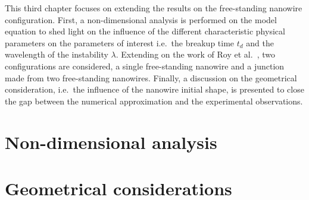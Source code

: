 This third chapter focuses on extending the results on the free-standing nanowire configuration. First, a non-dimensional analysis is performed on the model equation to shed light on the influence of the different characteristic physical parameters on the parameters of interest i.e.\ the breakup time $t_d$ and the wavelength of the instability $\lambda$. Extending on the work of Roy et al.\ \cite{RoyVarmaGururajan2021}, two configurations are considered, a single free-standing nanowire and a junction made from two free-standing nanowires. Finally, a discussion on the geometrical consideration, i.e.\ the influence of the nanowire initial shape, is presented to close the gap between the numerical approximation and the experimental observations.
\section{Non-dimensional analysis}
    \lipsum[1]
\section{Geometrical considerations}
    \lipsum[1]